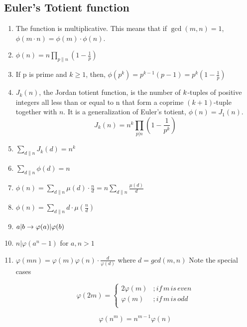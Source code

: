 \subsection{Euler's Totient function}
\begin{enumerate}
\item The function is multiplicative.  
  This means that if $\displaystyle \gcd(m, n) = 1$, $\displaystyle \phi(m \cdot n) = \phi(m) \cdot \phi(n)$.
\item $\displaystyle \phi(n) = n\prod_{p \|n}(1 - \frac{1}{p} )$
\item If p is prime and \(k \geq 1\), then, 
  $\displaystyle \phi(p^k) = p^{k - 1}(p - 1) = p^k(1 - \frac{1}{p})$
\item $J_k(n)$, the Jordan totient function, is the number of $\displaystyle \displaystyle k$-tuples of positive integers all less than or equal to n that form a coprime $\displaystyle (k + 1)$-tuple together with $n$. It is a generalization of Euler's totient, $\displaystyle \phi(n) = J_1(n)$.    
     $$J_k(n) = n^k\prod_{p |n}(1 - \frac{1}{p^k})$$
\item $\displaystyle \sum_{d\|n}J_k(d) = n^k$
\item $\displaystyle \sum_{d\|n}\phi(d) = n$
\item $\displaystyle \phi(n) = \sum_{d\|n}\mu(d)\cdot\frac{n}{d} = n\sum_{d\|n}\frac{\mu(d)}{d}$
\item $\displaystyle \phi(n) = \sum_{d\|n}d\cdot\mu(\frac{n}{d})$
 
\item $\displaystyle \displaystyle {a}\vert{b} \to \varphi(a)\vert{\varphi(b)}$
\item $n\vert{\varphi(a^n - 1)}$ for $\displaystyle a, n > 1$    
\item $\displaystyle \varphi(mn)=\varphi(m)\varphi(n)\cdot\frac{d}{\varphi(d)}$ where $d=gcd(m, n)$  
     Note the special cases
     
     $$
        \varphi(2m)=
        \begin{cases} 
          2\varphi(m) & ; if \, m  \, is \, even\\
          \varphi(m) & ; if \, m \, is \, odd\\
        \end{cases}$$  
     
     $$\displaystyle \varphi(n^m)=n^{m-1}\varphi(n)$$


\end{enumerate}
